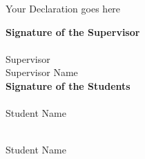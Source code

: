 \cleardoublepage


\begin{declaration}

Your Declaration goes here \\
\vskip 0.2in

\begin{center}
\large {\textbf{Signature of the Supervisor}}\\
\vskip 0.5in
\makebox[2.0in]{\hrulefill} \\
\smallskip Supervisor \\
\smallskip Supervisor Name\\
\vskip 0.2in 
\large {\textbf{Signature of the Students}}\\

\vskip 0.5in
\makebox[2.0in]{\hrulefill} \\
\smallskip Student Name

\vskip 0.3in
\makebox[2.0in]{\hrulefill} \\
\smallskip Student Name



\end{center}

\end{declaration}
